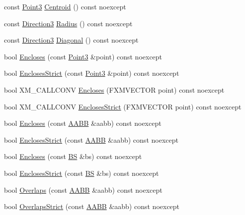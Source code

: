 \begin{DoxyCompactItemize}
\item 
const \hyperlink{structmage_1_1_point3}{Point3} \hyperlink{structmage_1_1_a_a_b_b_ab55cbe6917b4a69b7f87c65b5c879ef1}{Centroid} () const noexcept
\item 
const \hyperlink{structmage_1_1_direction3}{Direction3} \hyperlink{structmage_1_1_a_a_b_b_a5aa00d8ba4751f5e7b8caa2b43a2df32}{Radius} () const noexcept
\item 
const \hyperlink{structmage_1_1_direction3}{Direction3} \hyperlink{structmage_1_1_a_a_b_b_a9b9611522d1f5dd03e3c1787f8706b3d}{Diagonal} () const noexcept
\item 
bool \hyperlink{structmage_1_1_a_a_b_b_a308fce591178a9aeaed3838dfa32972f}{Encloses} (const \hyperlink{structmage_1_1_point3}{Point3} \&point) const noexcept
\item 
bool \hyperlink{structmage_1_1_a_a_b_b_a0399860c66da2dfc593b6ad5702c7525}{Encloses\+Strict} (const \hyperlink{structmage_1_1_point3}{Point3} \&point) const noexcept
\item 
bool X\+M\+\_\+\+C\+A\+L\+L\+C\+O\+NV \hyperlink{structmage_1_1_a_a_b_b_a97e3f57fc91e4fea04572382c94f4279}{Encloses} (F\+X\+M\+V\+E\+C\+T\+OR point) const noexcept
\item 
bool X\+M\+\_\+\+C\+A\+L\+L\+C\+O\+NV \hyperlink{structmage_1_1_a_a_b_b_aa8946038ce497c79fa0ee34e87aa9aed}{Encloses\+Strict} (F\+X\+M\+V\+E\+C\+T\+OR point) const noexcept
\item 
bool \hyperlink{structmage_1_1_a_a_b_b_a06f017756a593461127613e4d77d0944}{Encloses} (const \hyperlink{structmage_1_1_a_a_b_b}{A\+A\+BB} \&aabb) const noexcept
\item 
bool \hyperlink{structmage_1_1_a_a_b_b_af037df0800e1e8c3564363f154c2424a}{Encloses\+Strict} (const \hyperlink{structmage_1_1_a_a_b_b}{A\+A\+BB} \&aabb) const noexcept
\item 
bool \hyperlink{structmage_1_1_a_a_b_b_ab906cfa784000d7fd49e9a405825e72f}{Encloses} (const \hyperlink{structmage_1_1_b_s}{BS} \&bs) const noexcept
\item 
bool \hyperlink{structmage_1_1_a_a_b_b_af7c0070023a2b7d3b724cd4077782fb0}{Encloses\+Strict} (const \hyperlink{structmage_1_1_b_s}{BS} \&bs) const noexcept
\item 
bool \hyperlink{structmage_1_1_a_a_b_b_a0953268725119ef25651ab50ad3de658}{Overlaps} (const \hyperlink{structmage_1_1_a_a_b_b}{A\+A\+BB} \&aabb) const noexcept
\item 
bool \hyperlink{structmage_1_1_a_a_b_b_a00628d5ed2bf73021bbb3cdf94049580}{Overlaps\+Strict} (const \hyperlink{structmage_1_1_a_a_b_b}{A\+A\+BB} \&aabb) const noexcept

\end{DoxyCompactItemize}
